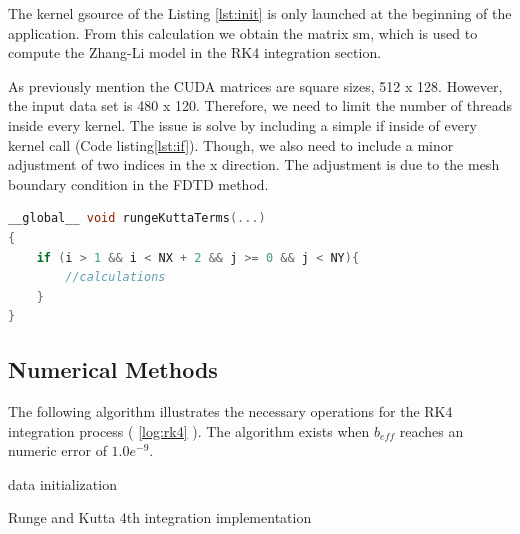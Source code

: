 The kernel {\listf gsource} of the Listing \ref{lst:init} is only launched at the beginning of the application. From this calculation we obtain the matrix {\listf sm}, which is used to compute the Zhang-Li model in the RK4 integration section.

As previously mention the CUDA matrices are square sizes, 512 x 128. However, the input data set is 480 x 120. Therefore, we need to limit the number of threads inside every kernel. The issue is solve by including a simple {\listf if} inside of every kernel call (Code listing\ref{lst:if}). Though, we also need to include a minor adjustment of two indices in the x direction. The adjustment is due to the mesh boundary condition in the FDTD method.

\begin{lstlisting}[language=C++, label={lst:if}, caption={Limit threads executing inside a kernel}]
__global__ void rungeKuttaTerms(...)
{
    if (i > 1 && i < NX + 2 && j >= 0 && j < NY){
    	//calculations
    }
}
\end{lstlisting}

\subsection{Numerical Methods}

The following algorithm illustrates the necessary operations for the RK4 integration process ( \ref{log:rk4} ). The algorithm exists when $b_{eff}$ reaches an numeric error of $1.0e^{-9}$.

\begin{algorithm}[H]
 data initialization\;
 \label{log:rk4}
 \caption{Runge and Kutta 4th integration implementation}
\end{algorithm}


